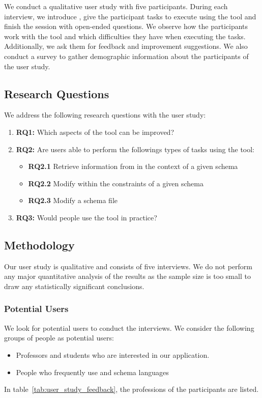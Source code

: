 We conduct a qualitative user study with five participants.
During each interview, we introduce \toolname{}, give the participant tasks to execute using the tool and finish the session with open-ended questions.
We observe how the participants work with the tool and which difficulties they have when executing the tasks.
Additionally, we ask them for feedback and improvement suggestions.
We also conduct a survey to gather demographic information about the participants of the user study.

\subsection{Research Questions}\label{subsec:research_questions}
We address the following research questions with the user study:
\begin{enumerate}
	\item \textbf{RQ1:} Which aspects of the tool can be improved?
	\item \textbf{RQ2:} Are users able to perform the followings types of tasks using the tool:
	 \begin{itemize}
			\item \textbf{RQ2.1} Retrieve information from \cfgfiles{} in the context of a given schema
			\item \textbf{RQ2.2} Modify \cfgfiles{} within the constraints of a given schema
			\item \textbf{RQ2.3} Modify a schema file
		\end{itemize}
	\item \textbf{RQ3:} Would people use the tool in practice?
\end{enumerate}

\subsection{Methodology}\label{subsec:methodology} %

Our user study is qualitative and consists of five interviews.
We do not perform any major quantitative analysis of the results as the sample size is too small to draw any statistically significant conclusions.

\subsubsection{Potential Users}
We look for potential users to conduct the interviews.
We consider the following groups of people as potential users:
\begin{itemize}
    \item Professors and students who are interested in our application.
    \item People who frequently use \cfgfiles{} and schema languages
\end{itemize}
In table~\ref{tab:user_study_feedback}, the professions of the participants are listed.

